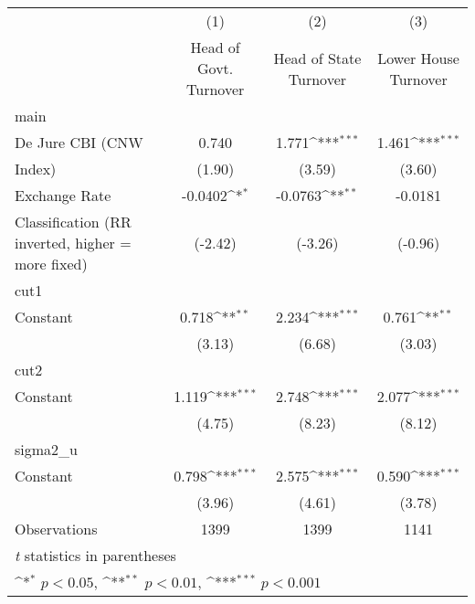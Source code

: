 {
\def\sym#1{\ifmmode^{#1}\else\(^{#1}\)\fi}
\begin{tabular}{l*{3}{c}}
\toprule
                &\multicolumn{1}{c}{(1)}&\multicolumn{1}{c}{(2)}&\multicolumn{1}{c}{(3)}\\
                &\multicolumn{1}{c}{Head of Govt. Turnover}&\multicolumn{1}{c}{Head of State Turnover}&\multicolumn{1}{c}{Lower House Turnover}\\
\midrule
main            &                  &                  &                  \\
De Jure CBI (CNW&    0.740         &    1.771\sym{***}&    1.461\sym{***}\\
Index)          &   (1.90)         &   (3.59)         &   (3.60)         \\
\addlinespace
Exchange Rate   &  -0.0402\sym{*}  &  -0.0763\sym{**} &  -0.0181         \\
Classification (RR inverted, higher = more fixed)&  (-2.42)         &  (-3.26)         &  (-0.96)         \\
\midrule
cut1            &                  &                  &                  \\
Constant        &    0.718\sym{**} &    2.234\sym{***}&    0.761\sym{**} \\
                &   (3.13)         &   (6.68)         &   (3.03)         \\
\midrule
cut2            &                  &                  &                  \\
Constant        &    1.119\sym{***}&    2.748\sym{***}&    2.077\sym{***}\\
                &   (4.75)         &   (8.23)         &   (8.12)         \\
\midrule
sigma2\_u        &                  &                  &                  \\
Constant        &    0.798\sym{***}&    2.575\sym{***}&    0.590\sym{***}\\
                &   (3.96)         &   (4.61)         &   (3.78)         \\
\midrule
Observations    &     1399         &     1399         &     1141         \\
\bottomrule
\multicolumn{4}{l}{\footnotesize \textit{t} statistics in parentheses}\\
\multicolumn{4}{l}{\footnotesize \sym{*} \(p<0.05\), \sym{**} \(p<0.01\), \sym{***} \(p<0.001\)}\\
\end{tabular}
}
